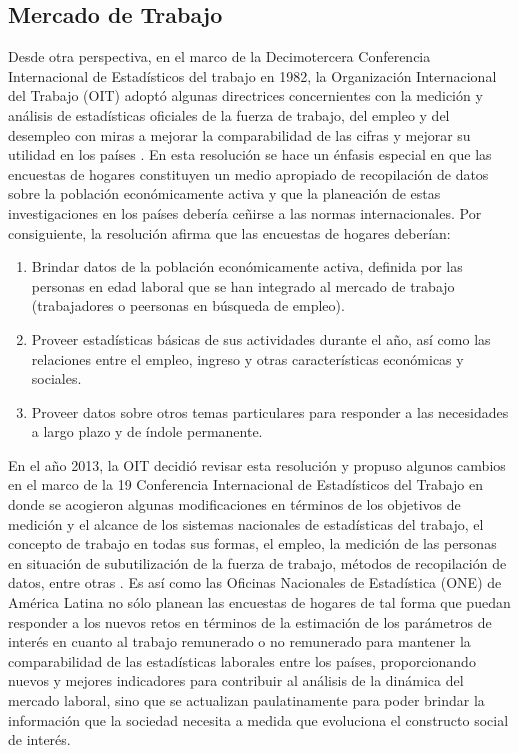 \documentclass[
  10pt,
  spanish,
]{book}
\providecommand{\tightlist}{%
  \setlength{\itemsep}{0pt}\setlength{\parskip}{0pt}}
\begin{document}
\hypertarget{mercado-de-trabajo}{%
\subsection*{Mercado de Trabajo}\label{mercado-de-trabajo}}

Desde otra perspectiva, en el marco de la Decimotercera Conferencia Internacional de Estadísticos del trabajo en 1982, la Organización Internacional del Trabajo (OIT) adoptó algunas directrices concernientes con la medición y análisis de estadísticas oficiales de la fuerza de trabajo, del empleo y del desempleo con miras a mejorar la comparabilidad de las cifras y mejorar su utilidad en los países \citep{OIT_1982}. En esta resolución se hace un énfasis especial en que las encuestas de hogares constituyen un medio apropiado de recopilación de datos sobre la población económicamente activa y que la planeación de estas investigaciones en los países debería ceñirse a las normas internacionales. Por consiguiente, la resolución afirma que las encuestas de hogares deberían:

\begin{enumerate}
\def\labelenumi{\arabic{enumi}.}
\tightlist
\item
  Brindar datos de la población económicamente activa, definida por las personas en edad laboral que se han integrado al mercado de trabajo (trabajadores o peersonas en búsqueda de empleo).
\item
  Proveer estadísticas básicas de sus actividades durante el año, así como las relaciones entre el empleo, ingreso y otras características económicas y sociales.
\item
  Proveer datos sobre otros temas particulares para responder a las necesidades a largo plazo y de índole permanente.
\end{enumerate}

En el año 2013, la OIT decidió revisar esta resolución y propuso algunos cambios en el marco de la 19 Conferencia Internacional de Estadísticos del Trabajo en donde se acogieron algunas modificaciones en términos de los objetivos de medición y el alcance de los sistemas nacionales de estadísticas del trabajo, el concepto de trabajo en todas sus formas, el empleo, la medición de las personas en situación de subutilización de la fuerza de trabajo, métodos de recopilación de datos, entre otras \citep{OIT_2013}. Es así como las Oficinas Nacionales de Estadística (ONE) de América Latina no sólo planean las encuestas de hogares de tal forma que puedan responder a los nuevos retos en términos de la estimación de los parámetros de interés en cuanto al trabajo remunerado o no remunerado para mantener la comparabilidad de las estadísticas laborales entre los países, proporcionando nuevos y mejores indicadores para contribuir al análisis de la dinámica del mercado laboral, sino que se actualizan paulatinamente para poder brindar la información que la sociedad necesita a medida que evoluciona el constructo social de interés.
\end{document}
